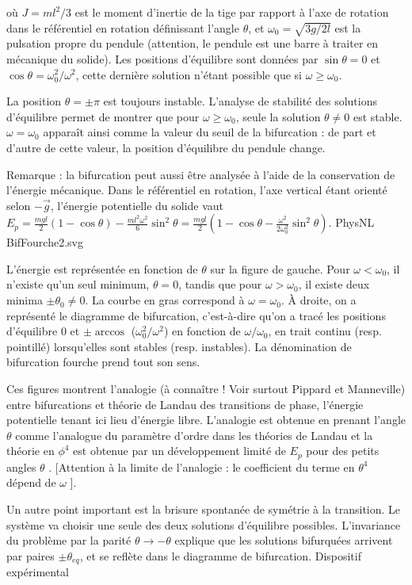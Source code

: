 \documentclass{article}%
\begin{document}
où $J = ml^2/3$ est le moment d'inertie de la tige par rapport à l'axe de rotation dans le référentiel en rotation définissant l'angle $\theta$, et $\omega_0 = \sqrt{3g/2l}$ est la pulsation propre du pendule (attention, le pendule est une barre à traiter en mécanique du solide). Les positions d'équilibre sont données par $\sin\theta = 0$ et $\cos\theta = \omega_0^2/\omega^2$, cette dernière solution n'étant possible que si $\omega \geq \omega_0$.

La position $\theta = \pm \pi$ est toujours instable. L'analyse de stabilité des solutions d'équilibre permet de montrer que pour $\omega \geq \omega_0$, seule la solution $\theta\neq 0$ est stable. $\omega = \omega_0$ apparaît ainsi comme la valeur du seuil de la bifurcation : de part et d'autre de cette valeur, la position d'équilibre du pendule change.

Remarque : la bifurcation peut aussi être analysée à l'aide de la conservation de l'énergie mécanique. Dans le référentiel en rotation, l'axe vertical étant orienté selon $-\vec g$, l'énergie potentielle du solide vaut
$E_p = \displaystyle \frac{mgl}{2} (1 - \cos\theta) - \frac{ml^2\omega^2}{6}\sin^2\theta = \frac{mgl}{2} \left( 1 - \cos\theta - \frac{\omega^2}{2 \omega_0^2} \sin^2\theta \right)$.
PhysNL BifFourche2.svg

L'énergie est représentée en fonction de $\theta$ sur la figure de gauche. Pour $\omega<\omega_0$, il n'existe qu'un seul minimum, $\theta = 0$, tandis que pour $\omega>\omega_0$, il existe deux minima $\pm \theta_0 \neq 0$. La courbe en gras correspond à $\omega = \omega_{0}$. À droite, on a représenté le diagramme de bifurcation, c'est-à-dire qu'on a tracé les positions d'équilibre 0 et $\pm \arccos$ ($\omega_{0}^2/\omega^2$) en fonction de $\omega/\omega_{0}$, en trait continu (resp. pointillé) lorsqu'elles sont stables (resp. instables). La dénomination de bifurcation fourche prend tout son sens.

Ces figures montrent l'analogie (à connaître ! Voir surtout Pippard et Manneville) entre bifurcations et théorie de Landau des transitions de phase, l'énergie potentielle tenant ici lieu d'énergie libre. L'analogie est obtenue en prenant l'angle $\theta$ comme l'analogue du paramètre d'ordre dans les théories de Landau et la théorie en $\phi^4$ est obtenue par un développement limité de $E_p$ pour des petits angles $\theta$ . [Attention à la limite de l'analogie : le coefficient du terme en $\theta^4$ dépend de $\omega$ ].

Un autre point important est la brisure spontanée de symétrie à la transition. Le système va choisir une seule des deux solutions d'équilibre possibles. L'invariance du problème par la parité $\theta \to -\theta$ explique que les solutions bifurquées arrivent par paires $\pm\theta_{eq}$, et se reflète dans le diagramme de bifurcation.
Dispositif expérimental
\end{document}
